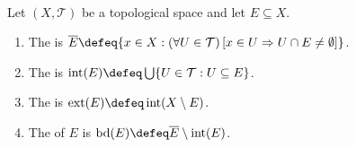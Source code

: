 \begin{definition} \label{def:topological-closure-interior-boundary} \\
Let $(X,\mathcal{T})$ be a topological space and let $E\subseteq X$.
\begin{enumerate}[label=(\roman*)]
\setlength{\itemsep}{0pt}
\item The  is $\overline{E}\defeq\{x\in X:(\forall U\in\mathcal{T})\,[x\in U\Rightarrow U\cap E\neq\emptyset]\}$.
\item The  is $\operatorname{int}(E)\defeq\bigcup\{U\in\mathcal{T}:U\subseteq E\}$.
\item The  is $\operatorname{ext}(E)\defeq\operatorname{int}(X\setminus E)$.
\item The  of $E$ is $\operatorname{bd}(E)\defeq\overline{E}\setminus\operatorname{int}(E)$.
\end{enumerate}
\end{definition}

